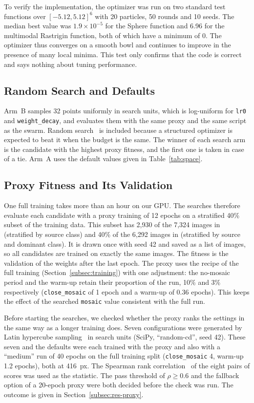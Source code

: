 To verify the implementation, the optimizer was run on two standard test functions over $[-5.12, 5.12]^6$ with 20 particles, 50 rounds and 10 seeds. The median best value was $1.9\times10^{-5}$ for the Sphere function and 6.96 for the multimodal Rastrigin function, both of which have a minimum of 0. The optimizer thus converges on a smooth bowl and continues to improve in the presence of many local minima. This test only confirms that the code is correct and says nothing about tuning performance.

\subsection{Random Search and Defaults}
\label{subsec:random}

Arm~B samples 32 points uniformly in search units, which is log-uniform for \texttt{lr0} and \texttt{weight\_decay}, and evaluates them with the same proxy and the same script as the swarm. Random search~\cite{bergstra2012random} is included because a structured optimizer is expected to beat it when the budget is the same. The winner of each search arm is the candidate with the highest proxy fitness, and the first one is taken in case of a tie. Arm~A uses the default values given in Table~\ref{tab:space}.

\subsection{Proxy Fitness and Its Validation}
\label{subsec:proxy}

One full training takes more than an hour on our GPU. The searches therefore evaluate each candidate with a proxy training of 12 epochs on a stratified 40\% subset of the training data. This subset has 2,930 of the 7,324 images in \genone (stratified by source class) and 40\% of the 6,292 images in \gentwo (stratified by source and dominant class). It is drawn once with seed 42 and saved as a list of images, so all candidates are trained on exactly the same images. The fitness is the validation \mapfifty of the weights after the last epoch. The proxy uses the recipe of the full training (Section~\ref{subsec:training}) with one adjustment: the no-mosaic period and the warm-up retain their proportion of the run, 10\% and 3\% respectively (\texttt{close\_mosaic} of 1 epoch and a warm-up of 0.36 epochs). This keeps the effect of the searched \texttt{mosaic} value consistent with the full run.

Before starting the \genone searches, we checked whether the proxy ranks the settings in the same way as a longer training does. Seven configurations were generated by Latin hypercube sampling~\cite{mckay1979comparison} in search units (SciPy, ``random-cd'', seed 42). These seven and the defaults were each trained with the proxy and also with a ``medium'' run of 40 epochs on the full training split (\texttt{close\_mosaic} 4, warm-up 1.2 epochs), both at 416~px. The Spearman rank correlation~\cite{spearman1904proof} of the eight pairs of scores was used as the statistic. The pass threshold of $\rho \ge 0.6$ and the fallback option of a 20-epoch proxy were both decided before the check was run. The outcome is given in Section~\ref{subsec:res-proxy}.

